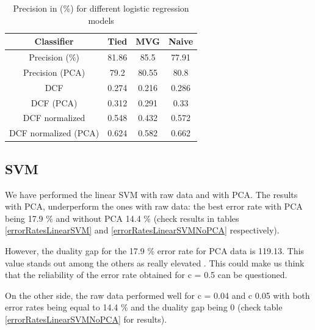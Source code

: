 \documentclass[twoside,a4paper,12pt]{report}
\begin{document}
\begin{table}[H]
    \centering
     \begin{tabular}{||c c c c||} 
        \hline \hline
        Classifier & Tied & MVG  & Naive \\
        \hline\hline
        Precision (\%) &  81.86 & \cellcolor{blue!25}  85.5 & 77.91  \\ 
        \hline
        Precision (PCA)  &  79.2 &  80.55 & 80.8 \\ 
        \hline
        DCF &  0.274 &  0.216 & 0.286  \\   
        \hline
        DCF (PCA)  &  0.312 &  0.291 & 0.33  \\   
        \hline
        DCF normalized &  0.548 &\cellcolor{blue!25}  0.432 & 0.572  \\ 
        \hline
        DCF normalized (PCA)  &  0.624 &  0.582 & 0.662    \\ 
        \hline \hline
    \end{tabular}
    
    \caption{Precision in (\%) for different logistic regression models \label{errorRatesConfusionMatrix}}
\end{table}


\subsection{SVM}

We have performed the linear SVM with raw data and with PCA. The results
with PCA, underperform the ones with raw data: the best error rate with PCA being
17.9 \% and without PCA 14.4 \% (check results in tables \ref{errorRatesLinearSVM} and \ref{errorRatesLinearSVMNoPCA} respectively).

However, the duality gap for the 17.9 \% error rate for PCA data is 119.13. This
value stands out among the others as really elevated . This could make us think 
that the reliability of the error rate obtained for c = 0.5 can be questioned.

On the other side, the raw data performed well for c = 0.04 and c 0.05
with both error rates being equal to 14.4 \% and the duality gap being 0
 (check table \ref{errorRatesLinearSVMNoPCA} for results).
\end{document}
